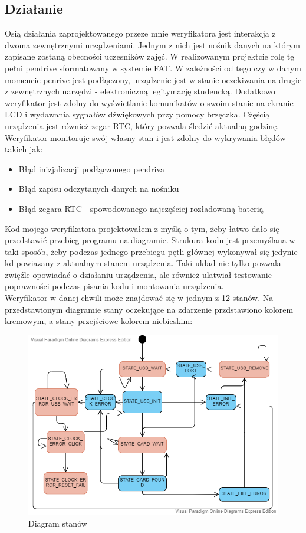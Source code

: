 \documentclass[declaration,shortabstract, mgr]{iithesis}
\begin{document}
\subsection{Działanie}
\indent Osią działania zaprojektowanego przeze mnie weryfikatora jest interakcja z dwoma zewnętrznymi urządzeniami. Jednym z nich jest nośnik danych na którym zapisane zostaną obecności uczesników zajęć. W realizowanym projektcie rolę tę pełni pendrive sformatowany w systemie FAT. W zależności od tego czy w danym momencie penrive jest podłączony, urządzenie jest w stanie oczekiwania na drugie z zewnętrznych narzędzi - elektroniczną legitymację studencką. Dodatkowo weryfikator jest zdolny do wyświetlanie komunikatów o swoim stanie na ekranie LCD i wydawania sygnałów dźwiękowych przy pomocy brzęczka. Cżęścią urządzenia jest również zegar RTC, który pozwala śledzić aktualną godzinę. Weryfikator monitoruje swój własny stan i jest zdolny do wykrywania błędów takich jak:
\begin{itemize}
\item Błąd inizjalizacji podłączonego pendriva
\item Błąd zapisu odczytanych danych na nośniku
\item Błąd zegara RTC - spowodowanego najczęściej rozładowaną baterią
\end{itemize}
\indent Kod mojego weryfikatora projektowałem z myślą o tym, żeby łatwo dało się przedstawić przebieg programu na diagramie. Strukura kodu jest przemyślana w taki sposób, żeby podczas jednego przebiegu pętli głównej wykonywał się jedynie kd powiazany z aktualnym stanem urządzenia. Taki układ nie tylko pozwala zwięźle opowiadać o działaniu urządzenia, ale również ulatwiał testowanie poprawności podczas pisania kodu i montowania urządzenia.\\
\indent Weryfikator w danej chwili może znajdować się w jednym z 12 stanów. Na przedstawionym diagramie stany oczekujące na zdarzenie przdstawiono kolorem kremowym, a stany przejściowe kolorem niebieskim:
\begin{figure}[h]
\caption{Diagram stanów}
\centering
\includegraphics[scale=0.6]{state_machine.png}
\end{figure}
\end{document}
